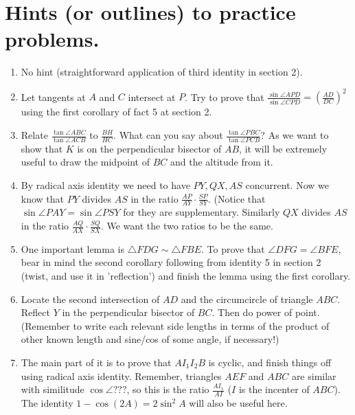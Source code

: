 \documentclass[11pt,a4paper]{article}
\begin{document}
\section {Hints (or outlines) to practice problems.}
\begin{enumerate}

\item No hint (straightforward application of third identity in section 2).

\item Let tangents at $A$ and $C$ intersect at $P$. Try to prove that $\frac{\sin\angle APD}{\sin\angle CPD}=(\frac{AD}{DC})^{2}$ using the first corollary of fact 5 at section 2.

\item Relate $\frac{\tan\angle ABC}{\tan\angle ACB}$ to $\frac{BH}{HC}.$ What can you say about $\frac{\tan\angle PBC}{\tan\angle PCB}$? As we want to show that $K$ is on the perpendicular bisector of $AB$, it will be extremely useful to draw the midpoint of $BC$ and the altitude from it.

\item By radical axis identity we need to have $PY, QX, AS$ concurrent. Now we know that $PY$ divides $AS$ in the ratio $\frac{AP}{AY}\cdot\frac{SP}{SY}$. (Notice that $\sin\angle PAY=\sin\angle PSY$ for they are supplementary. Similarly $QX$ divides $AS$ in the ratio $\frac{AQ}{AX}\cdot\frac{SQ}{SX}$. We want the two ratios to be the same.

\item One important lemma is $\triangle FDG\sim\triangle FBE$. To prove that $\angle DFG=\angle BFE$, bear in mind the second corollary following from identity 5 in section 2 (twist, and use it in 'reflection') and finish the lemma using the first corollary.

\item Locate the second intersection of $AD$ and the circumcircle of triangle $ABC$. Reflect $Y$ in the perpendicular bisector of $BC$. Then do power of point. (Remember to write each relevant side lengths in terms of the product of other known length and sine/cos of some angle, if necessary!) 

\item The main part of it is to prove that $AI_1I_2B$ is cyclic, and finish things off using radical axis identity. Remember, triangles $AEF$ and $ABC$ are similar with similitude $\cos\angle ???$, so this is the ratio $\frac{AI_1}{AI}$ ($I$ is the incenter of $ABC$). The identity $1-\cos (2A)=2\sin ^{2}A$ will also be useful here.


\end{enumerate}
\end{document}
